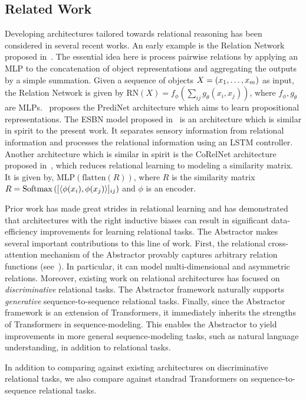 \subsection{Related Work}

Developing architectures tailored towards relational reasoning has been considered in several recent works. An early example is the Relation Network proposed in~\citep{santoro1}. The essential idea here is process pairwise relations by applying an MLP to the concatenation of object representations and aggregating the outputs by a simple summation. Given a sequence of objects $X = (x_1, \ldots, x_m)$ as input, the Relation Network is given by $\mathrm{RN}(X) = f_\phi(\sum_{ij} g_\theta(x_i, x_j))$, where $f_\phi, g_\theta$ are MLPs.~\citep{shanahanExplicitlyRelationalNeural} proposes the PrediNet architecture which aims to learn propositional representations. The ESBN model proposed in~\citep{esbn} is an architecture which is similar in spirit to the present work. It separates sensory information from relational information and processes the relational information using an LSTM controller. Another architecture which is similar in spirit is the CoRelNet architecture proposed in~\citep{kerg2022neural}, which reduces relational learning to modeling a similarity matrix. It is given by, $\mathrm{MLP}(\mathrm{flatten}(R))$, where $R$ is the similarity matrix $R = \mathrm{Softmax}\left([\left \langle \phi(x_i), \phi(x_j) \right\rangle]_{ij}\right)$ and $\phi$ is an encoder.

Prior work has made great strides in relational learning and has demonstrated that architectures with the right inductive biases can result in significant data-efficiency improvements for learning relational tasks. The Abstractor makes several important contributions to this line of work. First, the relational cross-attention mechanism of the Abstractor provably captures arbitrary relation functions (see~). In particular, it can model multi-dimensional and asymmetric relations. Moreover, existing work on relational architectures has focused on \textit{discriminative} relational tasks. The Abstractor framework naturally supports \textit{generative} sequence-to-sequence relational tasks. Finally, since the Abstractor framework is an extension of Transformers, it immediately inherits the strengths of Transformers in sequence-modeling. This enables the Abstractor to yield improvements in more general sequence-modeling tasks, such as natural language understanding, in addition to relational tasks.

In addition to comparing against existing architectures on discriminative relational tasks, we also compare against standrad Transformers on sequence-to-sequence relational tasks.